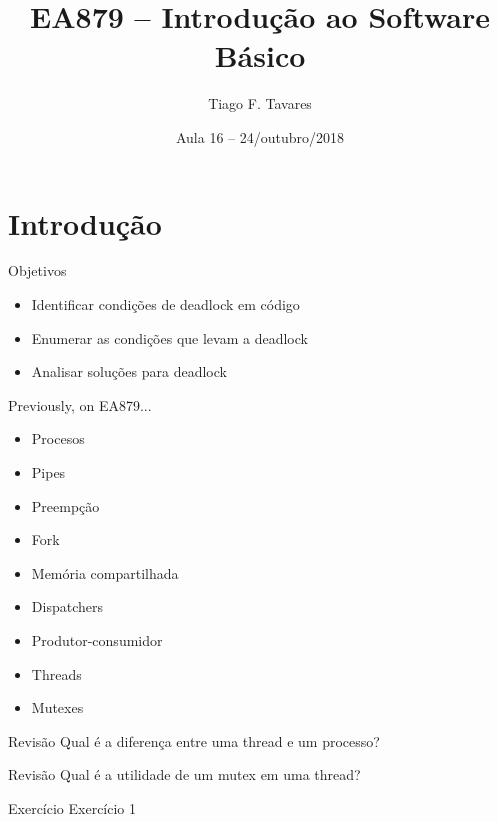 \documentclass{beamer}
\title[16-threads]{EA879 -- Introdução ao Software
Básico\\}
\author{Tiago F. Tavares}
\institute{FEEC -- UNICAMP}
\date{Aula 16 -- 24/outubro/2018}
\begin{document}
\begin{frame}
  \titlepage
\end{frame}


\section{Introdução}

\begin{frame}{Objetivos}
  \Large
  \begin{itemize}
    \item Identificar condições de deadlock em código
    \item Enumerar as condições que levam a deadlock
    \item Analisar soluções para deadlock
  \end{itemize}
\end{frame}

\begin{frame}[fragile]{Previously, on EA879...}
  \centering
  \Large
  \begin{itemize}
  \item Procesos
  \item Pipes
  \item Preempção
  \item Fork
  \item Memória compartilhada
  \item Dispatchers
  \item Produtor-consumidor
  \item Threads
  \item Mutexes
  \end{itemize}
\end{frame}

\begin{frame}[fragile]{Revisão}
  \centering
  \Large
  Qual é a diferença entre uma thread e um processo?
\end{frame}

\begin{frame}[fragile]{Revisão}
  \centering
  \Large
  Qual é a utilidade de um mutex em uma thread?
\end{frame}

\begin{frame}[fragile]{Exercício}
  \centering
  \Large
  Exercício 1
\end{frame}
\end{document}
